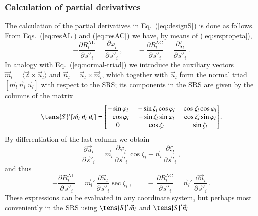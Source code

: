 \documentclass[structabstract]{aa}
\begin{document}
\subsubsection{Calculation of partial derivatives}\label{sec:source-pd}

The calculation of the partial derivatives in Eq.~(\ref{eq:designS}) is
done as follows. From Eqs.~(\ref{eq:resAL}) and (\ref{eq:resAC}) we
have, by means of (\ref{eq:srspropeta}),
\begin{equation}\label{eq:dfads}
-\frac{\partial R_l^\text{AL}}{\partial\vec{s}'_{\!i}}
= \frac{\partial\varphi_l}{\partial\vec{s}'_{\!i}}\, , \quad\quad
-\frac{\partial R_l^\text{AC}}{\partial\vec{s}'_{\!i}}
= \frac{\partial\zeta_l}{\partial\vec{s}'_{\!i}}\, .
\end{equation}
In analogy with Eq.~(\ref{eq:normal-triad}) we introduce the auxiliary 
vectors $\vec{m}_l=\langle\vec{z}\times\vec{u}_l\rangle$ and
$\vec{n}_l=\vec{u}_l\times\vec{m}_l$, which together with 
$\vec{u}_l$ form the normal triad $[\vec{m}_l~\vec{n}_l~\vec{u}_l]$
with respect to the SRS; its components in the SRS are given by the 
columns of the matrix
\begin{equation}\label{eq:srspqr}
\tens{S}'[\vec{m}_l~\vec{n}_l~\vec{u}_l] = \begin{bmatrix} 
-\sin\varphi_l &~  -\sin\zeta_l\cos\varphi_l  &~ \cos\zeta_l\cos\varphi_l \\ 
\phantom{-}\cos\varphi_l &~  -\sin\zeta_l\sin\varphi_l &~  \cos\zeta_l\sin\varphi_l \\ 
0 &~  \cos\zeta_l &~ \sin\zeta_l \end{bmatrix}.
\end{equation}
By differentiation of the last column we obtain
\begin{equation}\label{eq:srsprop1diff}
\frac{\partial\vec{u}_l}{\partial\vec{s}'_{\!i}} =
\vec{m}_l\,\frac{\partial\varphi_l}{\partial\vec{s}'_{\!i}}\cos\zeta_l +
\vec{n}_l\,\frac{\partial\zeta_l}{\partial\vec{s}'_{\!i}} \, ,
\end{equation}
and thus
\begin{equation}\label{eq:srsprop1diffsol}
-\frac{\partial R_l^\text{AL}}{\partial\vec{s}'_{\!i}} =
\vec{m}_l'\,\frac{\partial\vec{u}_l}{\partial\vec{s}'_{\!i}}\sec\zeta_l \, ,
\quad\quad
-\,\frac{\partial R_l^\text{AC}}{\partial\vec{s}'_{\!i}} =
\vec{n}_l'\,\frac{\partial\vec{u}_l}{\partial\vec{s}'_{\!i}} \, .
\end{equation}
These expressions can be evaluated in any coordinate system, but perhaps 
most conveniently in the SRS using $\tens{S}'\vec{m}_l$ and $\tens{S}'\vec{n}_l$
\end{document}
